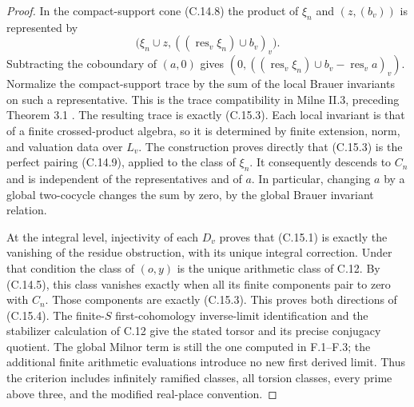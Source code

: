\begin{proof}
In the compact-support cone (C.14.8) the product
of $\xi_n$ and $(z,(b_v))$ is represented by
\[
 \bigl(\xi_n\cup z,
              ((\operatorname{res}_v\xi_n)\cup b_v)_v\bigr).
\]
Subtracting the coboundary of $(a,0)$ gives
$(0,((\operatorname{res}_v\xi_n)\cup b_v
                            -\operatorname{res}_v a)_v)$.
Normalize the compact-support trace by the sum of
the local Brauer invariants on such a representative.
This is the trace compatibility in Milne II.3,
preceding Theorem 3.1 \cite{MilneADT}.
The resulting trace is exactly (C.15.3). Each local
invariant is that of a finite crossed-product
algebra, so it is determined by finite extension,
norm, and valuation data over $L_v$.
The construction proves directly that (C.15.3)
is the perfect pairing (C.14.9), applied to the
class of $\xi_n$. It consequently descends to
$C_n$ and is independent of the representatives
and of $a$. In particular, changing $a$ by a
global two-cocycle changes the sum by zero, by
the global Brauer invariant relation.

At the integral level, injectivity of each $D_v$
proves that (C.15.1) is exactly the vanishing of
the residue obstruction, with its unique integral
correction. Under that condition the class of
$(o,y)$ is the unique arithmetic class of C.12.
By (C.14.5), this class vanishes exactly when
all its finite components pair to zero with
$C_n$. Those components are exactly (C.15.3).
This proves both directions of (C.15.4).
The finite-$S$ first-cohomology inverse-limit
identification and the stabilizer calculation
of C.12 give the stated torsor and its precise
conjugacy quotient. The global Milnor term is
still the one computed in F.1--F.3; the additional
finite arithmetic evaluations introduce no
new first derived limit. Thus the criterion
includes infinitely ramified classes, all
torsion classes, every prime above three, and
the modified real-place convention.
\end{proof}
